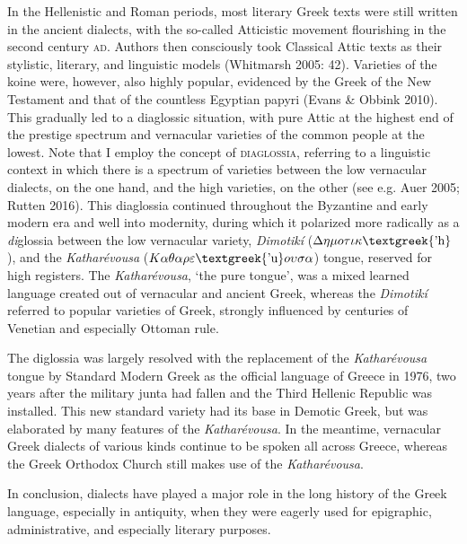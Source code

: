 \begin{styleStandard}
In the Hellenistic and Roman periods, most literary Greek texts were still written in the ancient dialects, with the so-called Atticistic movement flourishing in the second century \textsc{ad}. Authors then consciously took Classical Attic texts as their stylistic, literary, and linguistic models (Whitmarsh 2005: 42). Varieties of the koine were, however, also highly popular, evidenced by the Greek of the New Testament and that of the countless Egyptian papyri (Evans \& Obbink 2010). This gradually led to a diaglossic situation, with pure Attic at the highest end of the prestige spectrum and vernacular varieties of the common people at the lowest. Note that I employ the concept of \textsc{diaglossia}, referring to a linguistic context in which there is a spectrum of varieties between the low vernacular dialects, on the one hand, and the high varieties, on the other (see e.g. Auer 2005; Rutten 2016). This diaglossia continued throughout the Byzantine and early modern era and well into modernity, during which it polarized more radically as a \textit{di}glossia between the low vernacular variety, \textit{Dimotikí} ($\Delta \eta \mu o\tau \iota \kappa \text{\textgreek{'h}}$), and the \textit{Katharévousa} ($K\alpha \theta \alpha \rho \varepsilon \text{\textgreek{'u}}o\upsilon \sigma \alpha $) tongue, reserved for high registers. The \textit{Katharévousa}, ‘the pure tongue’, was a mixed learned language created out of vernacular and ancient Greek, whereas the \textit{Dimotikí }referred to popular varieties of Greek, strongly influenced by centuries of Venetian and especially Ottoman rule.
\end{styleStandard}

\begin{styleStandard}
The diglossia was largely resolved with the replacement of the \textit{Katharévousa} tongue by Standard Modern Greek as the official language of Greece in 1976, two years after the military junta had fallen and the Third Hellenic Republic was installed. This new standard variety had its base in Demotic Greek, but was elaborated by many features of the \textit{Katharévousa}. In the meantime, vernacular Greek dialects of various kinds continue to be spoken all across Greece, whereas the Greek Orthodox Church still makes use of the \textit{Katharévousa}.
\end{styleStandard}

\begin{styleStandard}
In conclusion, dialects have played a major role in the long history of the Greek language, especially in antiquity, when they were eagerly used for epigraphic, administrative, and especially literary purposes.
\end{styleStandard}

